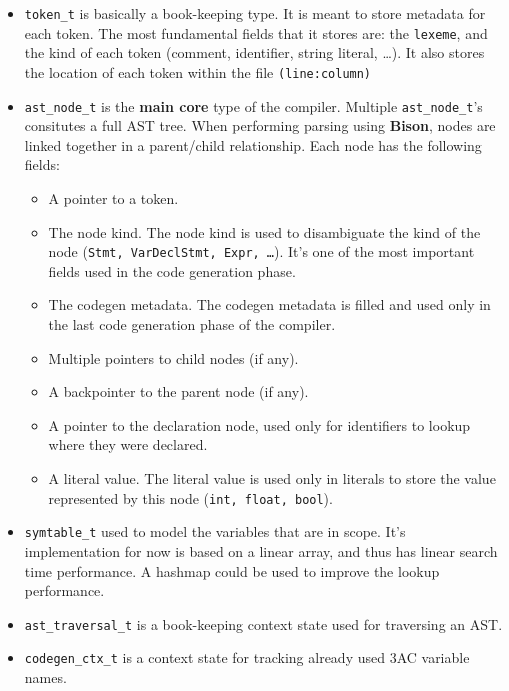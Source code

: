 \documentclass[a4paper]{article}
\begin{document}
\begin{itemize}
    \item \texttt{token\_t} is basically a book-keeping type. It is meant to store metadata for each token. The most fundamental
        fields that it stores are: the \texttt{lexeme}, and the kind of each token (comment, identifier, string literal, \dots). It also stores the location of each token within the file \texttt{(line:column)}
    \item \texttt{ast\_node\_t} is the \textbf{main core} type of the compiler. Multiple \texttt{ast\_node\_t}'s consitutes a full AST tree.
        When performing parsing using \textbf{Bison}, nodes are linked together in a parent/child relationship. Each node has the following fields:
        \begin{itemize}
            \item A pointer to a token.
            \item The node kind. The node kind is used to disambiguate the kind of the node (\texttt{Stmt, VarDeclStmt, Expr, \dots}). It's one of the most important fields used in the code generation phase.
            \item The codegen metadata. The codegen metadata is filled and used only in the last code generation phase of the compiler.
            \item Multiple pointers to child nodes (if any).
            \item A backpointer to the parent node (if any).
            \item A pointer to the declaration node, used only for identifiers to lookup where they were declared.
            \item A literal value. The literal value is used only in literals to store the value represented by this node (\texttt{int, float, bool}).
        \end{itemize}

    \item \texttt{symtable\_t} used to model the variables that are in scope. It's implementation for now is based on a linear array, and thus has linear search time performance.
        A hashmap could be used to improve the lookup performance.
    \item \texttt{ast\_traversal\_t} is a book-keeping context state used for traversing an AST.
    \item \texttt{codegen\_ctx\_t} is a context state for tracking already used 3AC variable names.
\end{itemize}
\end{document}
